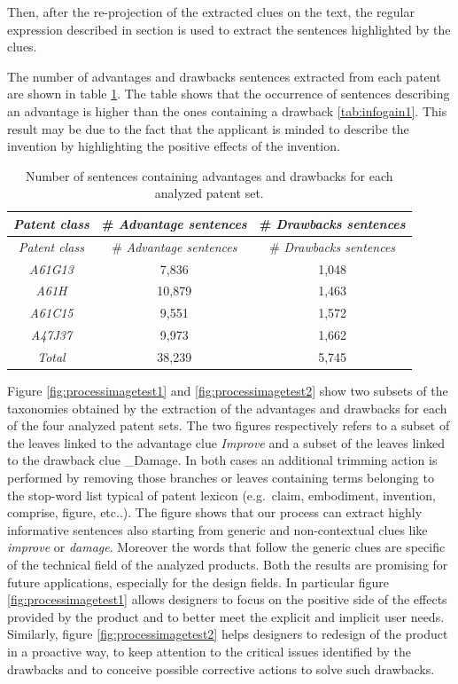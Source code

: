 \documentclass[]{book}
\begin{document}
Then, after the re-projection of the extracted clues on the text, the
regular expression described in section is used to extract the sentences
highlighted by the clues.

The number of advantages and drawbacks sentences extracted from each
patent are shown in table \ref{tab:advantagedrawbackssentences}. The
table shows that the occurrence of sentences describing an advantage is
higher than the ones containing a drawback \ref{tab:infogain1}. This
result may be due to the fact that the applicant is minded to describe
the invention by highlighting the positive effects of the invention.

\begin{longtable}[]{@{}ccc@{}}
\caption{\label{tab:advantagedrawbackssentences} Number of sentences
containing advantages and drawbacks for each analyzed patent
set.}\tabularnewline
\toprule
\emph{Patent class} & \# \emph{Advantage sentences} & \# \emph{Drawbacks
sentences}\tabularnewline
\midrule
\endfirsthead
\toprule
\emph{Patent class} & \# \emph{Advantage sentences} & \# \emph{Drawbacks
sentences}\tabularnewline
\midrule
\endhead
\emph{A61G13} & 7,836 & 1,048\tabularnewline
\emph{A61H} & 10,879 & 1,463\tabularnewline
\emph{A61C15} & 9,551 & 1,572\tabularnewline
\emph{A47J37} & 9,973 & 1,662\tabularnewline
\emph{Total} & 38,239 & 5,745\tabularnewline
\bottomrule
\end{longtable}

Figure \ref{fig:processimagetest1} and \ref{fig:processimagetest2} show
two subsets of the taxonomies obtained by the extraction of the
advantages and drawbacks for each of the four analyzed patent sets. The
two figures respectively refers to a subset of the leaves linked to the
advantage clue \emph{Improve} and a subset of the leaves linked to the
drawback clue \_Damage. In both cases an additional trimming action is
performed by removing those branches or leaves containing terms
belonging to the stop-word list typical of patent lexicon (e.g.~claim,
embodiment, invention, comprise, figure, etc..). The figure shows that
our process can extract highly informative sentences also starting from
generic and non-contextual clues like \emph{improve} or \emph{damage}.
Moreover the words that follow the generic clues are specific of the
technical field of the analyzed products. Both the results are promising
for future applications, especially for the design fields. In particular
figure \ref{fig:processimagetest1} allows designers to focus on the
positive side of the effects provided by the product and to better meet
the explicit and implicit user needs. Similarly, figure
\ref{fig:processimagetest2} helps designers to redesign of the product
in a proactive way, to keep attention to the critical issues identified
by the drawbacks and to conceive possible corrective actions to solve
such drawbacks.
\end{document}
